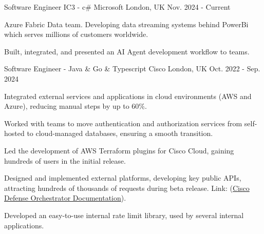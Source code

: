 

\begin{cventries}


\cventry
    {Software Engineer IC3 - c\#} %
    {Microsoft} %
    {London, UK} %
    {Nov. 2024 - Current} %
    {
      \begin{cvitems} %
        \item {Azure Fabric Data team. Developing data streaming systems behind PowerBi which serves millions of customers worldwide.}
        \item {Built, integrated, and presented an AI Agent development workflow to teams.}
      \end{cvitems}
    }


\cventry
    {Software Engineer - Java \& Go \& Typescript} %
    {Cisco} %
    {London, UK} %
    {Oct. 2022 - Sep. 2024} %
    {
      \begin{cvitems} %
        \item {Integrated external services and applications in cloud environments (AWS and Azure), reducing manual steps by up to 60\%.}
        \item {Worked with teams to move authentication and authorization services from self-hosted to cloud-managed databases, ensuring a smooth transition.}
        \item {Led the development of AWS Terraform plugins for Cisco Cloud, gaining hundreds of users in the initial release.}
        \item {Designed and implemented external platforms, developing key public APIs, attracting hundreds of thousands of requests during beta release. Link: (\href{https://developer.cisco.com/docs/cisco-defense-orchestrator/}{Cisco Defense Orchestrator Documentation}).}
        \item {Developed an easy-to-use internal rate limit library, used by several internal applications.}
      \end{cvitems}
    }


\end{cventries}
